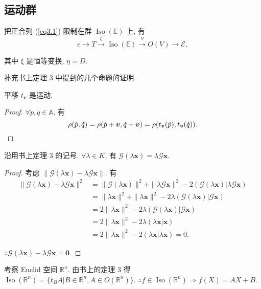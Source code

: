 \documentclass{ctexart}
\begin{document}
\subsection{运动群}
把正合列 (\ref{eq3.1}) 限制在群 $\operatorname{Iso}(\mathbb{E})$ 上, 有
\[e\to T\xrightarrow{\xi}\operatorname{Iso}(\mathbb{E})\xrightarrow{\eta}O(V)\to\mathcal{E},\]

其中 $\xi$ 是恒等变换, $\eta=D$.

补充书上定理 3 中提到的几个命题的证明.
\begin{theorem}
    平移 $t_{\boldsymbol{v}}$ 是运动.
\end{theorem}
\begin{proof}
    $\forall\dot{p},\dot{q}\in\mathbb{A}$, 有
    \[\rho(\dot{p},\dot{q})=\rho(\dot{p}+\boldsymbol{v},\dot{q}+\boldsymbol{v})=\rho(t_{\boldsymbol{v}}(\dot{p}),t_{\boldsymbol{v}}(\dot{q})).\qedhere\]
\end{proof}
\begin{theorem}
    沿用书上定理 3 的记号. $\forall\lambda\in K$, 有 $\mathcal{G}(\lambda\boldsymbol{x})=\lambda\mathcal{G}\boldsymbol{x}$.
\end{theorem}
\begin{proof}
    考虑 $\|\mathcal{G}(\lambda\boldsymbol{x})-\lambda\mathcal{G}\boldsymbol{x}\|$. 有
    \begin{align*}
        \|\mathcal{G}(\lambda\boldsymbol{x})-\lambda\mathcal{G}\boldsymbol{x}\|^2 & =\|\mathcal{G}(\lambda\boldsymbol{x})\|^2+\|\lambda\mathcal{G}\boldsymbol{x}\|^2-2(\mathcal{G}(\lambda\boldsymbol{x})|\lambda\mathcal{G}\boldsymbol{x}) \\
        & =\|\lambda\boldsymbol{x}\|^2+\|\lambda\boldsymbol{x}\|^2-2\lambda(\mathcal{G}(\lambda\boldsymbol{x})|\mathcal{G}\boldsymbol{x}) \\
        & =2\|\lambda\boldsymbol{x}\|^2-2\lambda(\mathcal{G}(\lambda\boldsymbol{x})|\mathcal{G}\boldsymbol{x}) \\
        & =2\|\lambda\boldsymbol{x}\|^2-2\lambda(\lambda\boldsymbol{x}|\boldsymbol{x}) \\
        & =2\|\lambda\boldsymbol{x}\|^2-2(\lambda\boldsymbol{x}|\lambda\boldsymbol{x})=0.
    \end{align*}

    $\therefore\mathcal{G}(\lambda\boldsymbol{x})-\lambda\mathcal{G}\boldsymbol{x}=\boldsymbol{0}$.
\end{proof}
考察 Euclid 空间 $\mathbb{R}^n$. 由书上的定理 3 得 $\operatorname{Iso}(\mathbb{R}^n)=\{t_{B}A|B\in\mathbb{R}^n,A\in O(\mathbb{R}^n)\}$. $\therefore f\in\operatorname{Iso}(\mathbb{R}^n)\Rightarrow f(X)=AX+B$.
\end{document}
